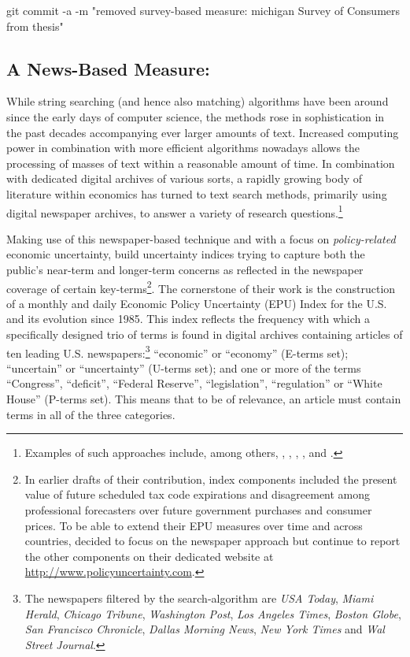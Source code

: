 \documentclass[a4paper,11pt,listof=nochaptergap,oneside,pointednumbers,bibtotoc,bigheadings,liststotoc]{scrbook}
\theoremstyle{mysatz}
\theoremstyle{mydefinition}
\theoremstyle{mybemerkung}
\begin{document}
git commit -a -m "removed survey-based measure: michigan Survey of Consumers from thesis"

\subsection{A News-Based Measure: \citet{bakeretal:15}}
\label{sec:epuindex}
While string searching (and hence also matching) algorithms have been around since the early days of computer science, the methods rose in sophistication in the past decades accompanying ever larger amounts of text. Increased computing power in combination with more efficient algorithms nowadays allows the processing of masses of text within a reasonable amount of time. In combination with dedicated digital archives of various sorts, a rapidly growing body of literature within economics has turned to text search methods, primarily using digital newspaper archives, to answer a variety of research questions.\footnote{Examples of such approaches include, among others, \citet{alexopoulosandcohen:09}, \citet{genthkowandshapiro:10}, \citet{hobergandphillips:10}, \citet{boudoukhetal:13}, and \citet{alexopoulosandcohen:15}.}

Making use of this newspaper-based technique and with a focus on \textit{policy-related} economic uncertainty, \citet{bakeretal:15} build uncertainty indices trying to capture both the public's near-term and longer-term concerns as reflected in the newspaper coverage of certain key-terms\footnote{In earlier drafts of their contribution, index components included the present value of future scheduled tax code expirations and disagreement among professional forecasters over future government purchases and consumer prices. To be able to extend their EPU measures over time and across countries, \citet{bakeretal:15} decided to focus on the newspaper approach but continue to report the other components on their dedicated website at \url{http://www.policyuncertainty.com}.}. The cornerstone of their work is the construction of a monthly and daily Economic Policy Uncertainty (EPU) Index for the U.S. and its evolution since 1985. This index reflects the frequency with which a specifically designed trio of terms is found in digital archives containing articles of ten leading U.S. newspapers:\footnote{The newspapers filtered by the search-algorithm are \textit{USA Today}, \textit{Miami Herald}, \textit{Chicago Tribune}, \textit{Washington Post}, \textit{Los Angeles Times}, \textit{Boston Globe}, \textit{San Francisco Chronicle}, \textit{Dallas Morning News}, \textit{New York Times} and \textit{Wal Street Journal}.} ``economic'' or ``economy'' (E-terms set); ``uncertain'' or ``uncertainty'' (U-terms set); and one or more of the terms ``Congress'', ``deficit'', ``Federal Reserve'', ``legislation'', ``regulation'' or ``White House'' (P-terms set). This means that to be of relevance, an article must contain terms in all of the three categories.
\end{document}
